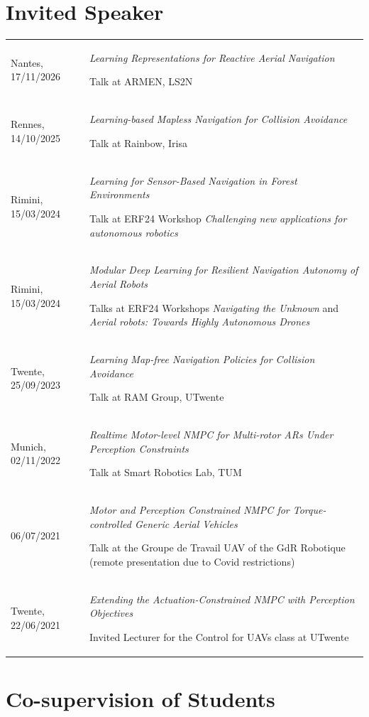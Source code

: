 \documentclass[11pt,a4paper]{article}
\newlength{\colone}
\newlength{\coltwo}
\begin{document}
\section{Invited Speaker}
\begin{longtable}{@{}p{\colone}p{\coltwo}@{}}
	Nantes, 17/11/2026
		& {
			\emph{Learning Representations for Reactive Aerial Navigation} \par
			Talk at ARMEN, LS2N
		}
\\
	Rennes, 14/10/2025
		& {
			\emph{Learning-based Mapless Navigation for Collision Avoidance} \par
			Talk at Rainbow, Irisa
		}
\\
	Rimini, 15/03/2024
		& {
			\emph{Learning for Sensor-Based Navigation in Forest Environments} \par
			Talk at ERF24 Workshop \emph{Challenging new applications for autonomous robotics}
		}
\\
	Rimini, 15/03/2024
		& {
			\emph{Modular Deep Learning for Resilient Navigation Autonomy of Aerial Robots} \par
			Talks at ERF24 Workshops \emph{Navigating the Unknown} and \emph{Aerial robots: Towards Highly Autonomous Drones}
		}
\\
	Twente, 25/09/2023 
		& {
			\emph{Learning Map-free Navigation Policies for Collision Avoidance} \par
			Talk at RAM Group, UTwente
		}
\\
	Munich, 02/11/2022 
		& {
			\emph{Realtime Motor-level NMPC for Multi-rotor ARs Under Perception Constraints} \par
			Talk at Smart Robotics Lab, TUM
		}
\\
	06/07/2021
		& {
			\emph{Motor and Perception Constrained NMPC for Torque-controlled Generic Aerial Vehicles} \par
			Talk at the Groupe de Travail UAV of the GdR Robotique (remote presentation due to Covid restrictions)
		}
\\
	Twente, 22/06/2021
		& {
			\emph{Extending the Actuation-Constrained NMPC with Perception Objectives} \par
			Invited Lecturer for the Control for UAVs class at UTwente
		}
\end{longtable}

\section{Co-supervision of Students}
\end{document}
